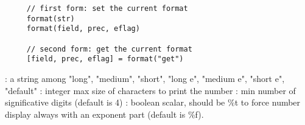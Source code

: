 

\begin{mandesc}
\end{mandesc}


\begin{calling_sequence}
   \begin{verbatim}
     // first form: set the current format
     format(str)
     format(field, prec, eflag)

     // second form: get the current format
     [field, prec, eflag] = format("get")
   \end{verbatim}
\end{calling_sequence}


\begin{parameters}

  \begin{varlist}
   : a string among "long", "medium", "short", "long e", "medium e", "short e", "default"
   : integer max size of characters to print the number
   : min number of significative digits (default is 4)
   : boolean scalar, should be \%t to force number display always with an exponent part (default is \%f).
  \end{varlist}

  \end{parameters}


